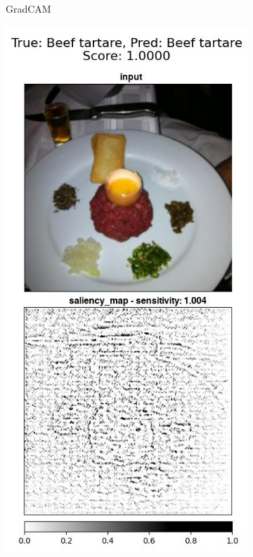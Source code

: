 \begin{figure}[ht]
\begin{subfigure}{.3\textwidth}
    \caption{GradCAM}\label{fig:sens-score-gradcam}
\end{subfigure}
 \begin{subfigure}{.31\textwidth}
    \centering
    \includegraphics[width=\textwidth]{results/metrics/243-Beef tartare-Beef tartare_vert.jpg}

\end{subfigure}
\end{figure}
